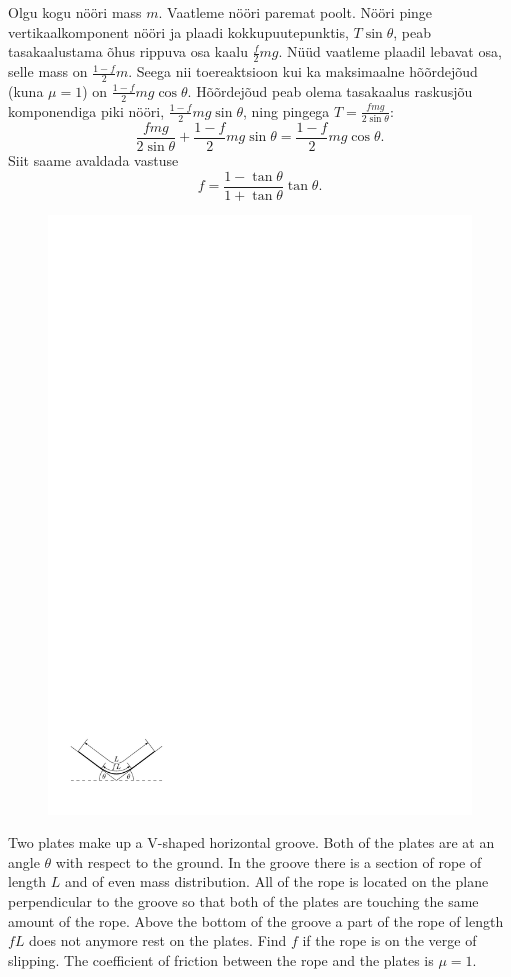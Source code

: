 \solu
Olgu kogu nööri mass $m$. Vaatleme nööri paremat poolt. Nööri pinge vertikaalkomponent nööri ja plaadi kokkupuutepunktis, $T \sin \theta$, peab tasakaalustama õhus rippuva osa kaalu $\frac{f}{2}mg$. Nüüd vaatleme plaadil lebavat osa, selle mass on $\frac{1-f}{2}m$. Seega nii toereaktsioon kui ka maksimaalne hõõrdejõud (kuna $\mu = 1$) on $\frac{1-f}{2}mg \cos \theta$. Hõõrdejõud peab olema tasakaalus raskusjõu komponendiga piki nööri, $\frac{1-f}{2}mg \sin \theta$, ning pingega $T=\frac{f m g}{2 \sin \theta}$: $$\frac{f m g}{2 \sin \theta} + \frac{1-f}{2}mg \sin \theta = \frac{1-f}{2}mg \cos \theta.$$
Siit saame avaldada vastuse $$f = \frac{1-\tan \theta}{1+\tan \theta} \tan \theta. $$

\begin{figure}
\includegraphics[width=\linewidth]{2012-lahg-09-n88r_ipe}
\end{figure}
Two plates make up a V-shaped horizontal groove. Both of the plates are at an angle $\theta$ with respect to the ground. In the groove there is a section of rope of length $L$ and of even mass distribution. All of the rope is located on the plane perpendicular to the groove so that both of the plates are touching the same amount of the rope. Above the bottom of the groove a part of the rope of length $fL$ does not anymore rest on the plates. Find $f$ if the rope is on the verge of slipping. The coefficient of friction between the rope and the plates is $\mu = 1$.

